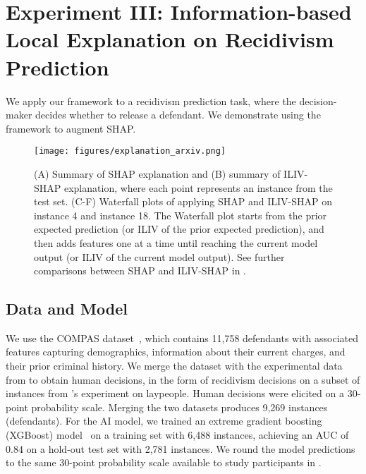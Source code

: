  \mvspace{-2mm}
\section{Experiment III: Information-based Local Explanation on Recidivism Prediction}
\label{exp3}
 \mvspace{-2mm}

We apply our framework to a recidivism prediction task, where the decision-maker decides whether to release a defendant.
We demonstrate using the framework to augment SHAP.


\begin{figure*}[!t]
    \centering
    \texttt{[image: figures/explanation\_arxiv.png]}
    \mvspace{-6mm}
    \caption{(A) Summary of SHAP explanation and (B) summary of ILIV-SHAP explanation, where each point represents an instance from the test set. (C-F) Waterfall plots of applying SHAP and ILIV-SHAP on instance 4 and instance 18. The Waterfall plot starts from the prior expected prediction (or ILIV of the prior expected prediction), and then adds features one at a time until reaching the current model output (or ILIV of the current model output). See further comparisons between SHAP and ILIV-SHAP in .}
    \mvspace{-4mm}
    \label{fig:explanation}
\end{figure*}
 \mvspace{-2mm}
\subsection{Data and Model}
 \mvspace{-2mm}
We use the COMPAS dataset~\citep{angwin2022machine}, which contains 11,758 defendants with associated features capturing demographics, information about their current charges, and their prior criminal history.
We merge the dataset with the experimental data from \citet{lin2020limits} to obtain human decisions, in the form of recidivism decisions on a subset of instances from \citet{angwin2022machine}'s experiment on laypeople. 
Human decisions were elicited on a 30-point probability scale.
Merging the two datasets produces 9,269 instances (defendants).
For the AI model, we trained an extreme gradient boosting (XGBoost) model~\citep{chen2016xgboost} on a training set with 6,488 instances, achieving an AUC of $0.84$ on a hold-out test set with 2,781 instances. 
We round the model predictions to the same 30-point probability scale available to study participants in \citet{lin2020limits}.


